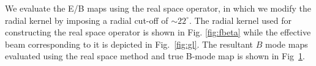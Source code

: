 \documentclass[12pt]{article}
\begin{document}
\begin{figure}[h]
\centering
{}
\caption{}
\label{fig:compare_B}
\end{figure}
%
We evaluate the E/B maps using the real space operator, in which we modify the radial kernel by imposing a radial cut-off of $\sim 22^{\circ}$.  The radial kernel used for constructing the real space operator is shown in Fig. \ref{fig:fbeta} while the effective beam corresponding to it is depicted in Fig.~\ref{fig:gl}. 
The resultant $B$ mode maps evaluated using the real space method and true B-mode map is shown in Fig~\ref{fig:compare_B}. 
%
\begin{figure}[!h]
\centering
{}
\caption{}
\label{fig:compare_spectra}
\end{figure}
\end{document}
